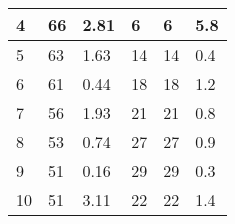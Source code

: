 \begin{table}[H]
\begin{tabular}{|l|l|l|l|l|l|}
\hline
4                   & 66                                                             & 2.81                                                             & 6         & 6                                                                           & 5.8                                                                             \\ 
\hline
5                   & 63                                                             & 1.63                                                             & 14        & 14                                                                          & 0.4                                                                             \\ 
\hline
6                   & 61                                                             & 0.44                                                             & 18        & 18                                                                          & 1.2                                                                             \\ 
\hline
7                   & 56                                                             & 1.93                                                             & 21        & 21                                                                          & 0.8                                                                             \\ 
\hline
8                   & 53                                                             & 0.74                                                             & 27        & 27                                                                          & 0.9                                                                             \\ 
\hline
9                   & 51                                                             & 0.16                                                             & 29        & 29                                                                          & 0.3                                                                             \\ 
\hline
10                  & 51                                                             & 3.11                                                             & 22        & 22                                                                          & 1.4                                                                             \\ 

\end{tabular}
\end{table}

